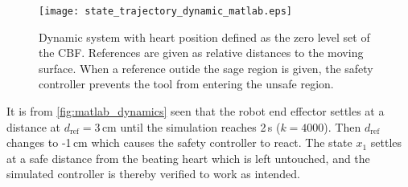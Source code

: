 \vspace{-2mm}
\begin{figure}[H]
	\center
		\texttt{[image: state\_trajectory\_dynamic\_matlab.eps]}
	\caption{Dynamic system with heart position defined as the zero level set of the CBF. References are given as relative distances to the moving surface. When a reference outide the sage region is given, the safety controller prevents the tool from entering the unsafe region.}
    \label{fig:matlab_dynamics}
\end{figure}
It is from \autoref{fig:matlab_dynamics} seen that the robot end effector settles at a distance at $d_\text{ref}=3\,$cm until the simulation reaches 2\,s ($k=4000$). Then $d_\text{ref}$ changes to -1\,cm which causes the safety controller to react. The state $x_1$ settles at a safe distance from the beating heart which is left untouched, and the simulated controller is thereby verified to work as intended.

